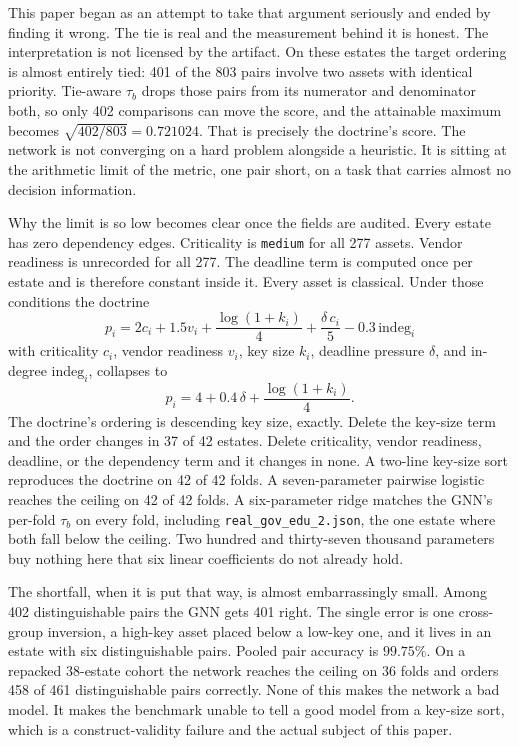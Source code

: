 \documentclass[journal,10pt]{IEEEtran}
\newcommand{\tb}{\tau_b}
\begin{document}
This paper began as an attempt to take that argument seriously and ended by finding it wrong. The
tie is real and the measurement behind it is honest. The interpretation is not licensed by the
artifact. On these estates the target ordering is almost entirely tied: 401 of the 803 pairs
involve two assets with identical priority. Tie-aware $\tb$ drops those pairs from its numerator
and denominator both, so only 402 comparisons can move the score, and the attainable maximum
becomes $\sqrt{402/803}=0.721024$. That is precisely the doctrine's score. The network is not
converging on a hard problem alongside a heuristic. It is sitting at the arithmetic limit of the
metric, one pair short, on a task that carries almost no decision information.

Why the limit is so low becomes clear once the fields are audited. Every estate has zero dependency
edges. Criticality is \texttt{medium} for all 277 assets. Vendor readiness is unrecorded for all
277. The deadline term is computed once per estate and is therefore constant inside it. Every
asset is classical. Under those conditions the doctrine
\begin{equation}
p_i = 2c_i + 1.5v_i + \frac{\log(1+k_i)}{4} + \frac{\delta\,c_i}{5} - 0.3\,\mathrm{indeg}_i
\label{eq:doctrine}
\end{equation}
with criticality $c_i$, vendor readiness $v_i$, key size $k_i$, deadline pressure $\delta$, and
in-degree $\mathrm{indeg}_i$, collapses to
\begin{equation}
p_i = 4 + 0.4\,\delta + \frac{\log(1+k_i)}{4}.
\label{eq:collapse}
\end{equation}
The doctrine's ordering is descending key size, exactly. Delete the key-size term and the order
changes in 37 of 42 estates. Delete criticality, vendor readiness, deadline, or the dependency
term and it changes in none. A two-line key-size sort reproduces the doctrine on 42 of 42 folds.
A seven-parameter pairwise logistic reaches the ceiling on 42 of 42 folds. A six-parameter ridge
matches the GNN's per-fold $\tb$ on every fold, including \texttt{real\_gov\_edu\_2.json}, the one
estate where both fall below the ceiling. Two hundred and thirty-seven thousand parameters buy
nothing here that six linear coefficients do not already hold.

The shortfall, when it is put that way, is almost embarrassingly small. Among 402 distinguishable
pairs the GNN gets 401 right. The single error is one cross-group inversion, a high-key asset
placed below a low-key one, and it lives in an estate with six distinguishable pairs. Pooled pair
accuracy is $99.75\%$. On a repacked 38-estate cohort the network reaches the ceiling on 36 folds
and orders 458 of 461 distinguishable pairs correctly. None of this makes the network a bad model.
It makes the benchmark unable to tell a good model from a key-size sort, which is a
construct-validity failure and the actual subject of this paper.
\end{document}
